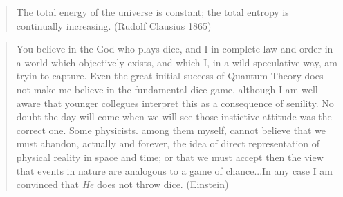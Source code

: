 \small
\begin{quote} 
The total energy of the universe is constant; the total entropy is 
continually increasing. (Rudolf Clausius 1865)
\end{quote}
\begin{quote}
You believe in the God who plays dice, and I in complete
law and order in a world which objectively exists, and which I, in a wild
speculative way, am tryin to capture. Even the great initial success of 
Quantum Theory does not make me
believe in the fundamental dice-game, although I am well aware that younger
collegues interpret this as a consequence of senility. No doubt the 
day will come when we will see those instictive attitude was the correct one.
Some physicists. among them myself, cannot believe that we must abandon,
actually and forever, the idea of direct representation of physical reality
in space and time; or that we must accept then the view that events in nature
are analogous to a game of chance...In any case I am convinced that \emph{He} 
does not
throw dice. (Einstein)
\end{quote}













